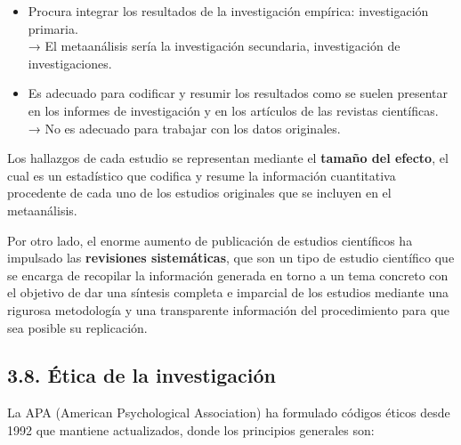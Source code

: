 \documentclass[
]{website}
\providecommand{\tightlist}{%
  \setlength{\itemsep}{0pt}\setlength{\parskip}{0pt}}
\begin{document}
\begin{itemize}
\tightlist
\item
  Procura integrar los resultados de la investigación empírica: investigación primaria.\\
  → El metaanálisis sería la investigación secundaria, investigación de investigaciones.
\item
  Es adecuado para codificar y resumir los resultados como se suelen presentar en los informes de investigación y en los artículos de las revistas científicas.\\
  → No es adecuado para trabajar con los datos originales.
\end{itemize}

Los hallazgos de cada estudio se representan mediante el \textbf{tamaño del efecto}, el cual es un estadístico que codifica y resume la información cuantitativa procedente de cada uno de los estudios originales que se incluyen en el metaanálisis.

Por otro lado, el enorme aumento de publicación de estudios científicos ha impulsado las \textbf{revisiones sistemáticas}, que son un tipo de estudio científico que se encarga de recopilar la información generada en torno a un tema concreto con el objetivo de dar una síntesis completa e imparcial de los estudios mediante una rigurosa metodología y una transparente información del procedimiento para que sea posible su replicación.

\subsection*{3.8. Ética de la investigación}\label{subtema3_8}

La APA (American Psychological Association) ha formulado códigos éticos desde 1992 que mantiene actualizados, donde los principios generales son:
\end{document}

